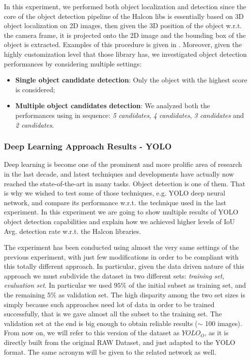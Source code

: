 In this experiment, we performed both object localization and detection since the core of the object detection pipeline of the Halcon libs is essentially based on 3D object localization on 2D images, then given the 3D position of the object w.r.t. the camera frame, it is projected onto the 2D image and the bounding box of the object is extracted. Examples of this procedure is given in . Moreover, given the highly customization level that those library has, we investigated object detection performances by considering multiple settings:

\begin{itemize}
	\item \textbf{Single object candidate detection}: Only the object with the highest score is considered;
	\item \textbf{Multiple object candidates detection}: We analyzed both the performances using in sequence: \emph{5 candidates}, \emph{4 candidates}, \emph{3 candidates} and \emph{2 candidates}.
\end{itemize}


\subsubsection{Deep Learning Approach Results - YOLO}\label{subsec:yolo_obj_det_results}

Deep learning is become one of the prominent and more prolific area of research in the last decade, and latest techniques and developments have actually now reached the state-of-the-art in many tasks. Object detection is one of them. That is why we wished to test some of those techniques, e.g. YOLO deep neural network, and compare its performance w.r.t. the technique used in the last experiment. In this experiment we are going to show multiple results of YOLO object detection capabilities and explain how we achieved higher levels of IoU Avg. detection rate w.r.t. the Halcon libraries.

The experiment has been conducted using almost the very same settings of the previous experiment, with just few modifications in order to be compliant with this totally different approach. In particular, given the data driven nature of this approach we must subdivide the dataset in two different sets: \emph{training set}, \emph{evaluation set}. In particular we used $95\%$ of the initial subset as training set, and the remaining $5\%$ as validation set. The high disparity among the two set sizes is simply because such approaches need lot of data in order to be trained successfully, that is we gave almost all the subset to the training set. The validation set at the end is big enough to obtain reliable results ($\sim$ 100 images). From now on, we will refer to this version of the dataset as \emph{$YOLO_O$}, as it is directly built from the original RAW Dataset, and just adapted to the YOLO format. The same acronym will be given to the related network as well.

